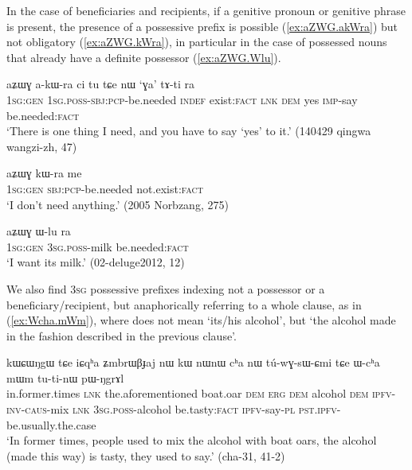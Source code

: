 In the case of beneficiaries and recipients, if a genitive pronoun or genitive phrase is present, the presence of a possessive prefix is possible (\ref{ex:aZWG.akWra}) but not obligatory (\ref{ex:aZWG.kWra}), in particular in the case of possessed nouns that already have a definite possessor (\ref{ex:aZWG.Wlu}).

 \begin{exe}
\ex \label{ex:aZWG.akWra}
\gll aʑɯɣ a-kɯ-ra ci tu tɕe nɯ `ɣa' tɤ-ti ra \\
\textsc{1sg}:\textsc{gen} \textsc{1sg}.\textsc{poss}-\textsc{sbj}:\textsc{pcp}-be.needed \textsc{indef} exist:\textsc{fact} \textsc{lnk} \textsc{dem} yes \textsc{imp}-say be.needed:\textsc{fact} \\
\glt `There is one thing I need, and you have to say `yes' to it.' (140429 qingwa wangzi-zh, 47)
\end{exe}

 \begin{exe}
\ex \label{ex:aZWG.kWra}
\gll  aʑɯɣ kɯ-ra me \\
\textsc{1sg}:\textsc{gen} \textsc{sbj}:\textsc{pcp}-be.needed not.exist:\textsc{fact} \\
\glt `I don't need anything.' (2005 Norbzang, 275)
\end{exe}

 \begin{exe}
\ex \label{ex:aZWG.Wlu}
\gll aʑɯɣ ɯ-lu ra \\
\textsc{1sg}:\textsc{gen} \textsc{3sg}.\textsc{poss}-milk be.needed:\textsc{fact} \\
\glt `I want its milk.' (02-deluge2012, 12)
\end{exe}

We also find \textsc{3sg} possessive prefixes  indexing not a possessor or a beneficiary/recipient, but anaphorically referring to a whole clause, as in (\ref{ex:Wcha.mWm}), where  does not mean `its/his alcohol', but `the alcohol made in the fashion described in the previous clause'.

 \begin{exe}
\ex \label{ex:Wcha.mWm}
\gll  kɯɕɯŋgɯ tɕe iɕqʰa ʑmbrɯβɟaj nɯ kɯ nɯnɯ cʰa nɯ tú-wɣ-sɯ-ɕmi tɕe 
ɯ-cʰa mɯm tu-ti-nɯ pɯ-ŋgrɤl \\
in.former.times \textsc{lnk} the.aforementioned boat.oar \textsc{dem} \textsc{erg} \textsc{dem} alcohol \textsc{dem} \textsc{ipfv}-\textsc{inv}-\textsc{caus}-mix \textsc{lnk} \textsc{3sg}.\textsc{poss}-alcohol be.tasty:\textsc{fact} \textsc{ipfv}-say-\textsc{pl} \textsc{pst}.\textsc{ipfv}-be.usually.the.case \\
\glt `In former times, people used to mix the alcohol with boat oars, the alcohol (made this way) is tasty, they used to say.' (cha-31, 41-2)
\end{exe}


